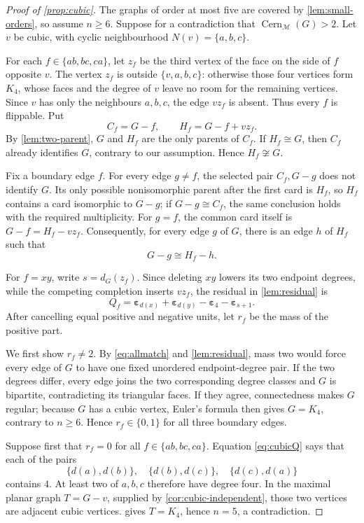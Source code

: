 \documentclass[10pt,a4paper]{amsart}
\newcommand{\Cern}{\operatorname{Cern}}
\newcommand{\M}{\mathcal M}
\newcommand{\eps}{\boldsymbol\varepsilon}
\begin{document}
\begin{proof}[Proof of \cref{prop:cubic}]
The graphs of order at most five are covered by
\cref{lem:small-orders}, so assume \(n\ge6\).  Suppose for a contradiction
that \(\Cern_{\M}(G)>2\).  Let \(v\) be cubic, with cyclic neighbourhood
\(N(v)=\{a,b,c\}\).

For each \(f\in\{ab,bc,ca\}\), let \(z_f\) be the third vertex of the face
on the side of \(f\) opposite \(v\).  The vertex \(z_f\) is outside
\(\{v,a,b,c\}\): otherwise those four vertices form \(K_4\), whose faces
and the degree of \(v\) leave no room for the remaining vertices.  Since
\(v\) has only the neighbours \(a,b,c\), the edge \(vz_f\) is absent.
Thus every \(f\) is flippable.  Put
\[
             C_f=G-f,\qquad H_f=G-f+vz_f.
\]
By \cref{lem:two-parent}, \(G\) and \(H_f\) are the only parents of
\(C_f\).  If \(H_f\cong G\), then \(C_f\) already identifies \(G\),
contrary to our assumption.  Hence \(H_f\not\cong G\).

Fix a boundary edge \(f\).  For every edge \(g\ne f\), the selected pair
\(C_f,G-g\) does not identify \(G\).  Its only possible nonisomorphic parent
after the first card is \(H_f\), so \(H_f\) contains a card isomorphic to
\(G-g\); if \(G-g\cong C_f\), the same conclusion holds with the required
multiplicity.  For \(g=f\), the common card itself is
\(G-f=H_f-vz_f\).  Consequently, for every edge \(g\) of \(G\), there is an
edge \(h\) of \(H_f\) such that
\[
                         G-g\cong H_f-h.           \tag{E.1}\label{eq:allmatch}
\]

For \(f=xy\), write \(s=d_G(z_f)\).  Since deleting \(xy\) lowers its two
endpoint degrees, while the competing completion inserts \(vz_f\), the
residual in \cref{lem:residual} is
\[
 Q_f=\eps_{d(x)}+\eps_{d(y)}-\eps_4-\eps_{s+1}.    \tag{E.2}\label{eq:cubicQ}
\]
After cancelling equal positive and negative units, let \(r_f\) be the mass
of the positive part.

We first show \(r_f\ne2\).  By \eqref{eq:allmatch} and
\cref{lem:residual}, mass two would force every edge of \(G\) to have one
fixed unordered endpoint-degree pair.  If the two degrees differ, every edge
joins the two corresponding degree classes and \(G\) is bipartite,
contradicting its triangular faces.  If they agree, connectedness makes
\(G\) regular; because \(G\) has a cubic vertex, Euler's formula then gives
\(G=K_4\), contrary to \(n\ge6\).  Hence \(r_f\in\{0,1\}\) for all three
boundary edges.

Suppose first that \(r_f=0\) for all \(f\in\{ab,bc,ca\}\).  Equation
\eqref{eq:cubicQ} says that each of the pairs
\[
           \{d(a),d(b)\},\quad \{d(b),d(c)\},\quad \{d(c),d(a)\}
\]
contains \(4\).  At least two of \(a,b,c\) therefore have degree four.
In the maximal planar graph \(T=G-v\), supplied by
\cref{cor:cubic-independent}, those two vertices are adjacent cubic
vertices.   gives \(T=K_4\), hence \(n=5\), a
contradiction.


\end{proof}
\end{document}
